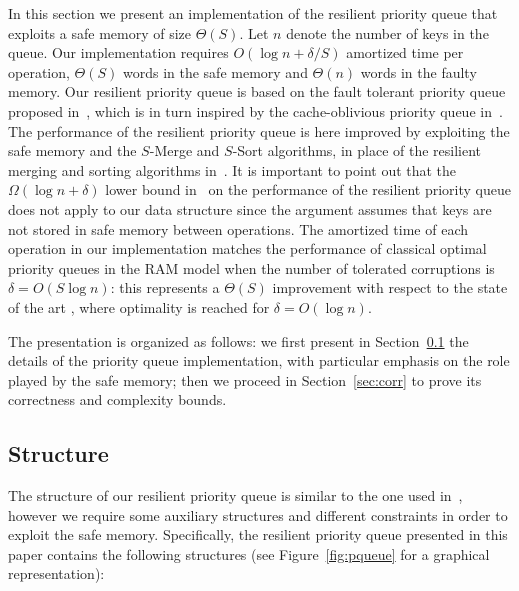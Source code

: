 \documentclass[review,number]{elsarticle}
\newcommand{\BO}[1]{{O}\left(#1\right)}
\newcommand{\BT}[1]{{\Theta}\left(#1\right)}
\newcommand{\BOM}[1]{{\Omega}\left(#1\right)}
\newcommand{\SMerge}{$S$-\textsf{Merge}}
\newcommand{\SSort}{$S$-\textsf{Sort}}
\begin{document}
In this section we present an implementation of the resilient priority queue
that exploits a safe memory of size $\BT{S}$. Let $n$ denote the number of keys
in the queue. Our implementation requires $\BO{\log n + \delta / S}$ amortized
time per operation, $\BT{S}$ words in the safe memory and $\BT{n}$ words in the
faulty memory. 
Our resilient priority queue  is based
on the fault tolerant priority queue proposed in~\cite{JMM07}, which is in turn
inspired by the cache-oblivious priority queue in~\cite{ArgeBDHM07}. The
performance of the resilient priority queue is here improved by exploiting the
safe memory and the \SMerge{} and \SSort{} algorithms, in place of the resilient
merging and sorting algorithms in~\cite{FGI09}. It is important to point out
that the $\BOM{\log n + \delta}$ lower bound in~\cite{JMM07} on the performance
of the resilient priority queue does not apply to our data structure since the
argument assumes that keys are not stored in safe memory between operations. 
The amortized time of each operation in our implementation matches the
performance of classical
optimal priority queues in the RAM model when the number of tolerated
corruptions  is $\delta=\BO{S \log n}$: this represents a 
$\BT{S}$ improvement with respect to the state of the art
\cite{JMM07}, where optimality is reached for $\delta=\BO{\log n}$.

The presentation is organized as follows: we first present in
Section~\ref{sec:struct} the details of the priority queue implementation, with
particular emphasis on the role played by the safe memory; then we proceed in
Section~\ref{sec:corr} to prove its correctness and complexity bounds.
 

\subsection{Structure}\label{sec:struct}
The structure of our resilient priority queue is similar to the one used
in~\cite{JMM07}, however we require some auxiliary structures and different
constraints in order to exploit the safe
memory. Specifically, the resilient priority queue presented in this paper
contains the following structures (see Figure~\ref{fig:pqueue} for a graphical
representation):
\end{document}
